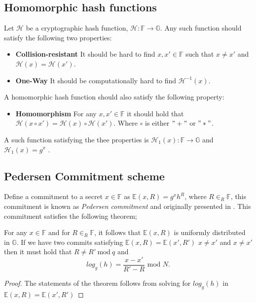 \subsection*{Homomorphic hash functions}
Let $\mathcal{H}$ be a cryptographic hash function, $\mathcal{H}:\mathds{F}\to \mathds{G}$. Any such function should satisfy the following two properties:
\begin{itemize}
    \item \textbf{Collision-resistant} It should be hard to find $x,x'\in\mathds{F}$ such that $x\neq x'$ and $\mathcal{H}(x)=\mathcal{H}(x')$.
    \item \textbf{One-Way} It should be computationally hard to find $\mathcal{H}^{-1}(x)$.
\end{itemize}

A homomorphic hash function should also satisfy the following property:
\begin{itemize}
    \item \textbf{Homomorphism} For any $x,x'\in\mathds{F}$ it should hold that $\mathcal{H}(x\circ x') = \mathcal{H}(x)\circ\mathcal{H}(x')$. Where $\circ$ is either $"+"$ or $"*"$.
\end{itemize}

A such function satisfying the thee properties is $\mathcal{H}_1(x):\mathds{F}\to\mathds{G}$ and $\mathcal{H}_1(x)= g^{x}$ \cite{HHF}. 


\subsection*{Pedersen Commitment scheme}
Define a commitment to a secret $x\in\mathds{F}$ as $\mathds{E}(x,R)=g^xh^R$, where $R\in_R\mathds{F}$, this commitment is known as \textit{Pedersen commitment} and originally presented in \cite{pedersen}. This commitment satisfies the following theorem;
\\
\begin{thm}
\label{thm:C=g^xh^R}
For any $x\in\mathds{F}$ and for $R\in_R\mathds{F}$, it follows that   $\mathds{E}(x,R)$ is uniformly distributed in $\mathds{G}$. If we have two commits satisfying $\mathds{E}(x,R)=\mathds{E}(x',R')$  $x\neq x'$ and  $x\neq x'$ then it must hold that $R\neq R' \:\text{mod}\:q$ and 
\begin{equation*}
    log_g(h) = \frac{x-x'}{R'-R} \text{ mod }N.
\end{equation*}
\end{thm}
\begin{proof}
The statements of the theorem follows from solving for $log_g(h)$ in $\mathds{E}(x,R)=\mathds{E}(x',R')$ 
\end{proof}

